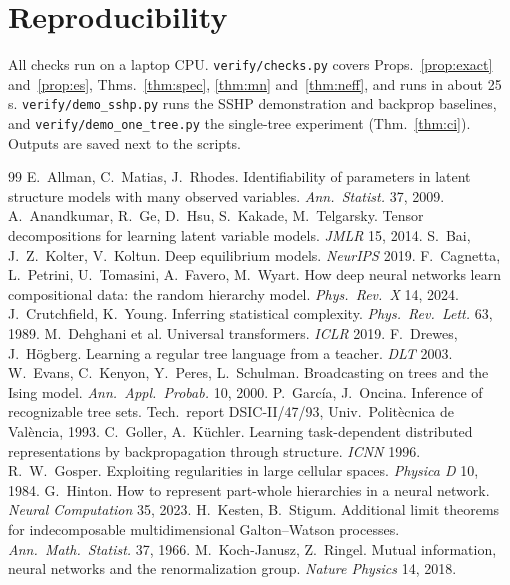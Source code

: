 \documentclass[11pt]{article}
\theoremstyle{definition}
\begin{document}
\appendix
\section{Reproducibility}
All checks run on a laptop CPU. \texttt{verify/checks.py} covers Props.~\ref{prop:exact}
and~\ref{prop:es}, Thms.~\ref{thm:spec}, \ref{thm:mn} and~\ref{thm:neff}, and runs in about 25\,s.
\texttt{verify/demo\_sshp.py} runs the SSHP demonstration and backprop baselines, and
\texttt{verify/demo\_one\_tree.py} the single-tree experiment (Thm.~\ref{thm:ci}).
Outputs are saved next to the scripts.

\begin{thebibliography}{99}\small
{} E.~Allman, C.~Matias, J.~Rhodes. Identifiability of parameters in latent structure models with many observed variables. \emph{Ann.\ Statist.} 37, 2009.
 A.~Anandkumar, R.~Ge, D.~Hsu, S.~Kakade, M.~Telgarsky. Tensor decompositions for learning latent variable models. \emph{JMLR} 15, 2014.
 S.~Bai, J.~Z.~Kolter, V.~Koltun. Deep equilibrium models. \emph{NeurIPS} 2019.
 F.~Cagnetta, L.~Petrini, U.~Tomasini, A.~Favero, M.~Wyart. How deep neural networks learn compositional data: the random hierarchy model. \emph{Phys.\ Rev.\ X} 14, 2024.
 J.~Crutchfield, K.~Young. Inferring statistical complexity. \emph{Phys.\ Rev.\ Lett.} 63, 1989.
 M.~Dehghani et al. Universal transformers. \emph{ICLR} 2019.
 F.~Drewes, J.~H\"ogberg. Learning a regular tree language from a teacher. \emph{DLT} 2003.
 W.~Evans, C.~Kenyon, Y.~Peres, L.~Schulman. Broadcasting on trees and the Ising model. \emph{Ann.\ Appl.\ Probab.} 10, 2000.
 P.~Garc\'ia, J.~Oncina. Inference of recognizable tree sets. Tech.\ report DSIC-II/47/93, Univ.\ Polit\`ecnica de Val\`encia, 1993.
 C.~Goller, A.~K\"uchler. Learning task-dependent distributed representations by backpropagation through structure. \emph{ICNN} 1996.
 R.~W.~Gosper. Exploiting regularities in large cellular spaces. \emph{Physica D} 10, 1984.
 G.~Hinton. How to represent part-whole hierarchies in a neural network. \emph{Neural Computation} 35, 2023.
 H.~Kesten, B.~Stigum. Additional limit theorems for indecomposable multidimensional Galton--Watson processes. \emph{Ann.\ Math.\ Statist.} 37, 1966.
 M.~Koch-Janusz, Z.~Ringel. Mutual information, neural networks and the renormalization group. \emph{Nature Physics} 14, 2018.

\end{thebibliography}
\end{document}

